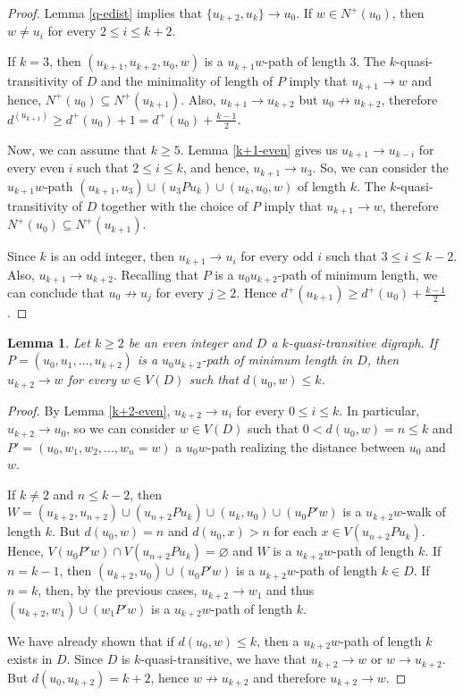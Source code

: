 \documentclass[preprint]{elsarticle}
\newtheorem{lem}[thm]{Lemma}
\begin{document}
\begin{proof}
Lemma \ref{q-edist} implies that $\{ u_{k+2}, u_k \} \to u_0$.   If $w \in N^+(u_0)$, then $w \ne u_i$ for every $2 \le i \le k+2$.

If $k = 3$, then $(u_{k+1}, u_{k+2}, u_0, w)$ is a $u_{k+1} w$-path of length $3$.   The $k$-quasi-transitivity of $D$ and the minimality of length of $P$ imply that $u_{k+1} \to w$ and hence, $N^+ (u_0) \subseteq N^+ (u_{k+1})$.   Also, $u_{k+1} \to u_{k+2}$ but $u_0 \not \to u_{k+2}$, therefore $d^(u_{k+1}) \ge d^+(u_0) + 1 = d^+(u_0) + \frac{k-1}{2}$.

Now, we can assume that $k \ge 5$.   Lemma \ref{k+1-even} gives us $u_{k+1} \to u_{k-i}$ for every even $i$ such that $2 \le i \le k$, and hence, $u_{k+1} \to u_3$.   So, we can consider the $u_{k+1} w$-path $(u_{k+1}, u_3) \cup (u_3 P u_k) \cup (u_k, u_0, w)$ of length $k$.   The $k$-quasi-transitivity of $D$ together with the choice of $P$ imply that $u_{k+1} \to w$, therefore $N^+(u_0) \subseteq N^+(u_{k+1})$.

Since $k$ is an odd integer, then $u_{k+1} \to u_i$ for every odd $i$ such that $3 \le i \le k-2$.   Also, $u_{k+1} \to u_{k+2}$.   Recalling that $P$ is a $u_0 u_{k+2}$-path of minimum length, we can conclude that $u_0 \not \to u_j$ for every $j \ge 2$.   Hence $d^+(u_{k+1}) \ge d^+(u_0) + \frac{k-1}{2}$.
\end{proof}

\begin{lem} \label{dom-k+2-even}
Let $k \ge 2$ be an even integer and $D$ a $k$-quasi-transitive digraph.   If $P = (u_0, u_1, \dots, u_{k+2})$ is a $u_0 u_{k+2}$-path of minimum length in $D$, then $u_{k+2} \to w$ for every $w \in V(D)$ such that $d(u_0, w) \le k$.
\end{lem}

\begin{proof}
By Lemma \ref{k+2-even}, $u_{k+2} \to u_i$ for every $0 \le i \le k$.   In particular, $u_{k+2} \to u_0$, so we can consider $w \in V(D)$ such that $0 < d(u_0, w) = n \le k$ and $P' = (u_0, w_1, w_2, \dots, w_n = w)$ a $u_0 w$-path realizing the distance between $u_0$ and $w$.

If $k \ne 2$ and $n \le k-2$, then $W = (u_{k+2}, u_{n+2}) \cup (u_{n+2} P u_k) \cup (u_k, u_0) \cup (u_0 P' w)$ is a $u_{k+2} w$-walk of length $k$.   But $d(u_0, w) = n$ and $d(u_0, x) > n$ for each $x \in V(u_{n+2} P u_k)$.   Hence, $V(u_0 P' w) \cap V(u_{n+2} P u_k) = \varnothing$ and $W$ is a $u_{k+2} w$-path of length $k$.   If $n = k-1$, then $(u_{k+2}, u_0) \cup (u_0 P' w)$ is a $u_{k+2} w$-path of length $k \in D$.   If $n = k$, then, by the previous cases, $u_{k+2} \to w_1$ and thus $(u_{k+2}, w_1) \cup (w_1 P' w)$ is a $u_{k+2} w$-path of length $k$.

We have already shown that if $d(u_0, w) \le k$, then a $u_{k+2} w$-path of length $k$ exists in $D$.   Since $D$ is $k$-quasi-transitive, we have that $u_{k+2} \to w$ or $w \to u_{k+2}$.   But $d(u_0, u_{k+2}) = k+2$, hence $w \not \to u_{k+2}$ and therefore $u_{k+2} \to w$.
\end{proof}
\end{document}
